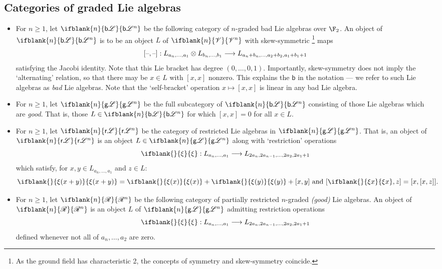 \documentclass[10pt]{article}
\newcommand{\RestLie}[1]%
{\ifblank{#1}{\mathsf{r}{\scrL}}{\mathsf{r}{\scrL}^{#1}}}
\newcommand{\GoodLie}[1]%
{\ifblank{#1}{\mathsf{g}{\scrL}}{\mathsf{g}{\scrL}^{#1}}}
\newcommand{\BadLie}[1]%
{\ifblank{#1}{\mathsf{b}{\scrL}}{\mathsf{b}{\scrL}^{#1}}}
\newcommand{\PRLie}[1]%
{\ifblank{#1}{\scrR}{\scrR^{#1}}}
\newcommand{\GR}[1]{\ifblank{#1}{\scrV}{\scrV^{#1}}}
\newcommand{\restn}[2][]{\ifblank{#1}{\xi{#2}}{\xi_{#1}{#2}}}%
\begin{document}
\begin{CategoriesOfInterest}
\subsection{Categories of graded Lie algebras}

\begin{itemize}
\setlength{\parindent}{.25in}
\item For $n\geq1$, let $\BadLie{n}$ be the following category of $n$-graded bad Lie algebras over $\F_2$. An object of $\BadLie{n}$ is to be an object $L$ of $\GR{n}$ with skew-symmetric%
\footnote{As the ground field has characteristic 2, the concepts of symmetry and skew-symmetry coincide.} maps
\[[\textup{--},\textup{--}]:L_{a_n,\ldots,a_1}\otimes L_{b_n,\ldots,b_1}\longrightarrow L_{a_n+b_n,\ldots,a_2+b_2,a_1+b_1+1}\]
satisfying the Jacobi identity. Note that this Lie bracket has degree $(0,\ldots,0,1)$. Importantly, skew-symmetry does not imply the `alternating' relation, so that there may be $x\in L$ with $[x,x]$ nonzero. This explains the $\mathsf{b}$ in the notation --- we refer to such Lie algebras as \emph{bad} Lie algebras.
Note that the `self-bracket' operation $x\mapsto [x,x]$ is linear in any bad Lie algebra.
\item For $n\geq1$, let $\GoodLie{n}$ be the full subcategory of $\BadLie{n}$ consisting of those Lie algebras which are \emph{good}. That is, those $L\in\BadLie{n}$ for which $[x,x]=0$ for all $x\in L$.
\item For $n\geq1$, let $\RestLie{n}$ be the category of restricted Lie algebras in $\GoodLie{n}$. That is, an object of $\RestLie{n}$ is an object $L\in\GoodLie{n}$ along with `restriction' operations
\[\restn{}:L_{a_n,\ldots,a_1}\to L_{2a_n,2a_{n-1},\ldots,2a_2,2a_1+1}\]
which satisfy, for $x,y\in L_{a_n,\ldots,a_1}$ and $z\in L$: \[\restn{(x+y)}=\restn{(x)}+\restn{(y)}+[x,y]\textup{ and }[\restn{x},z]=[x,[x,z]].\]
\item For $n\geq1$, let $\PRLie{n}$ be the following category of partially restricted $n$-graded \emph{(good)} Lie algebras. An object of $\PRLie{n}$ is an object $L$ of $\GoodLie{n}$
admitting restriction operations
\[\restn{}:L_{a_n,\ldots,a_1}\to L_{2a_n,2a_{n-1},\ldots,2a_2,2a_1+1}\]
defined whenever not all of $a_n,\ldots,a_{2}$ are zero. %

\end{itemize}
\end{CategoriesOfInterest}
\end{document}
